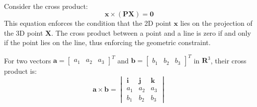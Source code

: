 \\ Consider the cross product:
\[
	\mathbf{x} \times (\mathbf{P} \mathbf{X}) = \mathbf{0}
\]
This equation enforces the condition that the 2D point \( \mathbf{x} \) lies on the projection of the 3D point \( \mathbf{X} \). The cross product between a point and a line is zero if and only if the point lies on the line, thus enforcing the geometric constraint.

For two vectors \( \mathbf{a} = \begin{bmatrix} a_1 & a_2 & a_3 \end{bmatrix}^T \) and
\( \mathbf{b} = \begin{bmatrix} b_1 & b_2 & b_3 \end{bmatrix}^T \) in \( \mathbf{R}^3 \), their cross product is:
\[
	\mathbf{a} \times \mathbf{b} = \begin{vmatrix} \mathbf{i} & \mathbf{j} & \mathbf{k} \\ a_1 & a_2 & a_3 \\ b_1 & b_2 & b_3 \end{vmatrix}
\]



